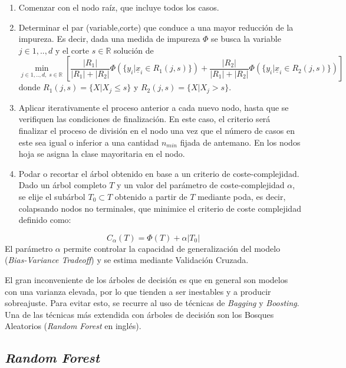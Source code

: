 \documentclass[12pt,a4paper,]{book}
\numberwithin{dummy}{section}
\theoremstyle{ocrenumbox}
\theoremstyle{blacknumex}
\theoremstyle{blacknumbox}
\theoremstyle{ocrenum}
\theoremstyle{ocrenum}
\begin{document}
\begin{enumerate}
\def\labelenumi{\arabic{enumi}.}
\item
  Comenzar con el nodo raíz, que incluye todos los casos.
\item
  Determinar el par (variable,corte) que conduce a una mayor reducción
  de la impureza. Es decir, dada una medida de impureza \(\Phi\) se
  busca la variable \(j \in {1,..,d}\) y el corte \(s \in \mathbb{R}\)
  solución de \[\min_{j \in {1,..,d},\;s \in \mathbb{R}}\left[ 
  \frac{|R_1|}{|R_1|+|R_2|} \Phi \left(\{y_i |\underline x_i \in R_1(j,s)\} \right)  + 
  \frac{|R_2|}{|R_1|+|R_2|} \Phi \left(\{y_i |\underline x_i \in R_2(j,s)\} \right)\right]\]
  donde \(R_1(j,s) = \{X | X_j \le s \}\) y
  \(R_2(j,s) = \{X | X_j > s \}\).
\item
  Aplicar iterativamente el proceso anterior a cada nuevo nodo, hasta
  que se verifiquen las condiciones de finalización. En este caso, el
  criterio será finalizar el proceso de división en el nodo una vez que
  el número de casos en este sea igual o inferior a una cantidad
  \(n_{min}\) fijada de antemano. En los nodos hoja se asigna la clase
  mayoritaria en el nodo.
\item
  Podar o recortar el árbol obtenido en base a un criterio de
  coste-complejidad. Dado un árbol completo \(T\) y un valor del
  parámetro de coste-complejidad \(\alpha\), se elije el subárbol
  \(T_0 \subset T\) obtenido a partir de \(T\) mediante poda, es decir,
  colapsando nodos no terminales, que minimice el criterio de coste
  complejidad definido como:
\end{enumerate}

\[C_{\alpha}(T) = \Phi(T) + \alpha|T_0|\] El parámetro \(\alpha\)
permite controlar la capacidad de generalización del modelo
(\emph{Bias-Variance Tradeoff}) y se estima mediante Validación Cruzada.

El gran inconveniente de los árboles de decisión es que en general son
modelos con una varianza elevada, por lo que tienden a ser inestables y
a producir sobreajuste. Para evitar esto, se recurre al uso de técnicas
de \emph{Bagging} y \emph{Boosting}. Una de las técnicas más extendida
con árboles de decisión son los Bosques Aleatorios (\emph{Random Forest}
en inglés).

\hypertarget{random-forest}{%
\subsection{\texorpdfstring{\emph{Random
Forest}}{Random Forest}}\label{random-forest}}
\end{document}
